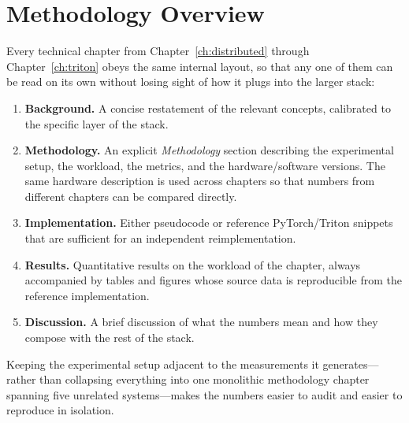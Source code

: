 \section{Methodology Overview}\label{sec:intro_methodology}
Every technical chapter from Chapter~\ref{ch:distributed} through
Chapter~\ref{ch:triton} obeys the same internal layout, so that any
one of them can be read on its own without losing sight of how it
plugs into the larger stack:
\begin{enumerate}
    \item \textbf{Background.} A concise restatement of the relevant
          concepts, calibrated to the specific layer of the stack.
    \item \textbf{Methodology.} An explicit \emph{Methodology} section
          describing the experimental setup, the workload, the metrics,
          and the hardware/software versions. The same hardware
          description is used across chapters so that numbers from
          different chapters can be compared directly.
    \item \textbf{Implementation.} Either pseudocode or reference
          PyTorch/Triton snippets that are sufficient for an independent
          reimplementation.
    \item \textbf{Results.} Quantitative results on the workload of the
          chapter, always accompanied by tables and figures whose source
          data is reproducible from the reference implementation.
    \item \textbf{Discussion.} A brief discussion of what the numbers
          mean and how they compose with the rest of the stack.
\end{enumerate}
Keeping the experimental setup adjacent to the measurements it
generates---rather than collapsing everything into one monolithic
methodology chapter spanning five unrelated systems---makes the
numbers easier to audit and easier to reproduce in isolation.

